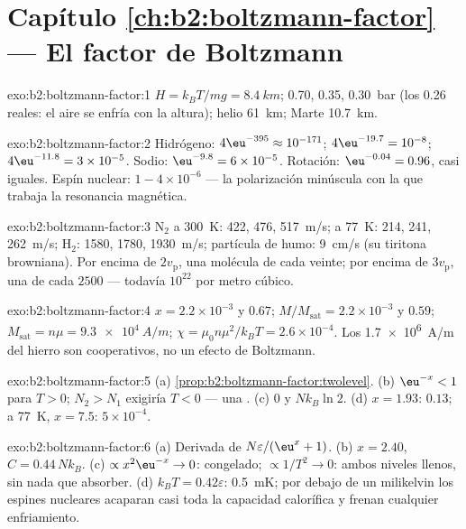 \section*{Capítulo \ref{ch:b2:boltzmann-factor} --- El factor de Boltzmann}

\begin{solution}{exo:b2:boltzmann-factor:1}
$H = k_BT/mg = \qty{8.4}{km}$; \qty{0.70}{}, \qty{0.35}{}, \qty{0.30}{bar} (los
\qty{0.26}{} reales: el aire se enfría con la altura); helio \qty{61}{km}; Marte
\qty{10.7}{km}.
\end{solution}

\begin{solution}{exo:b2:boltzmann-factor:2}
Hidrógeno: $4\eu^{-395} \approx 10^{-171}$; $4\eu^{-19.7} = 10^{-8}$; $4\eu^{-11.8} = 3 \times
10^{-5}$. Sodio: $\eu^{-9.8} = 6 \times 10^{-5}$. Rotación: $\eu^{-0.04} = 0.96$, casi
iguales. Espín nuclear: $1 - 4 \times 10^{-6}$ --- la polarización minúscula con la que
trabaja la resonancia magnética.
\end{solution}

\begin{solution}{exo:b2:boltzmann-factor:3}
N$_2$ a \qty{300}{K}: \qty{422}{}, \qty{476}{}, \qty{517}{m/s}; a \qty{77}{K}: \qty{214}{}, \qty{241}{},
\qty{262}{m/s}; H$_2$: \qty{1580}{}, \qty{1780}{}, \qty{1930}{m/s}; partícula de humo:
\qty{9}{cm/s} (su tiritona browniana). Por encima de $2v_{\text{p}}$, una molécula de
cada veinte; por encima de $3v_{\text{p}}$, una de cada $2500$ --- todavía $10^{22}$ por metro cúbico.
\end{solution}

\begin{solution}{exo:b2:boltzmann-factor:4}
$x = 2.2 \times 10^{-3}$ y $0.67$; $M/M_{\text{sat}} = 2.2 \times 10^{-3}$ y $0.59$;
$M_{\text{sat}} = n\mu = \qty{9.3e4}{A/m}$; $\chi = \mu_0n\mu^2/k_BT = 2.6 \times 10^{-4}$.
Los \qty{1.7e6}{A/m} del hierro son cooperativos, no un efecto de Boltzmann.
\end{solution}

\begin{solution}{exo:b2:boltzmann-factor:5}
(a) \cref{prop:b2:boltzmann-factor:twolevel}. (b) $\eu^{-x} < 1$ para $T > 0$;
$N_2 > N_1$ exigiría $T < 0$ --- una . (c) $0$ y
$Nk_B\ln 2$. (d) $x = 1.93$: $0.13$; a \qty{77}{K}, $x = 7.5$: $5 \times 10^{-4}$.
\end{solution}

\begin{solution}{exo:b2:boltzmann-factor:6}
(a) Derivada de $N\varepsilon/(\eu^x + 1)$. (b) $x = 2.40$, $C = 0.44\,Nk_B$.
(c) $\propto x^2\eu^{-x} \to 0$: congelado; $\propto 1/T^2 \to 0$: ambos niveles llenos,
sin nada que absorber. (d) $k_BT = 0.42\varepsilon$: \qty{0.5}{mK}; por debajo de un
milikelvin los espines nucleares acaparan casi toda la capacidad calorífica y
frenan cualquier enfriamiento.
\end{solution}

